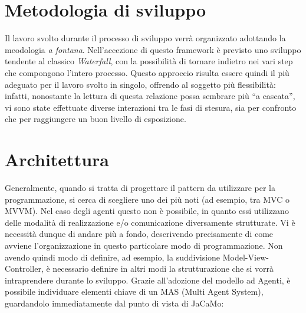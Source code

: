 \documentclass[12pt,a4paper,openright,oneside]{report}
\newcommand{\quotes}[1]{``#1''}
\begin{document}
\section{Metodologia di sviluppo}
\label{sec:Metodologia}
Il lavoro svolto durante il processo di sviluppo verrà organizzato adottando la meodologia \textit{a fontana}. Nell'accezione di questo framework è previsto uno sviluppo tendente al classico \textit{Waterfall}, con la possibilità di tornare indietro nei vari step che compongono l'intero processo. Questo approccio risulta essere quindi il più adeguato per il lavoro svolto in singolo, offrendo al soggetto più flessibilità: infatti, nonostante la lettura di questa relazione possa sembrare più \quotes{a cascata}, vi sono state effettuate diverse interazioni tra le fasi di stesura, sia per confronto che per raggiungere un buon livello di esposizione.



\section{Architettura}						%
\label{sec:Architettura}
Generalmente, quando si tratta di progettare il pattern da utilizzare per la programmazione, si cerca di scegliere uno dei più noti (ad esempio, tra MVC o MVVM). Nel caso degli agenti questo non è possibile, in quanto essi utilizzano delle modalità di realizzazione e/o comunicazione diversamente strutturate. Vi è necessità dunque di andare più a fondo, descrivendo precisamente di come avviene l'organizzazione in questo particolare modo di programmazione. Non avendo quindi modo di definire, ad esempio, la suddivisione Model-View-Controller, è necessario definire in altri modi la strutturazione che si vorrà intraprendere durante lo sviluppo. Grazie all'adozione del modello ad Agenti, è possibile individuare elementi chiave di un MAS (Multi Agent System), guardandolo immediatamente dal punto di vista di JaCaMo:
\end{document}
